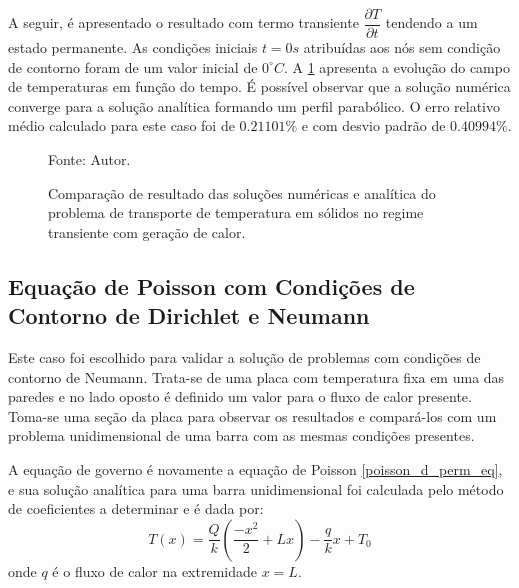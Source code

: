 A seguir, é apresentado o resultado com termo transiente $\dfrac{\partial T}{\partial t}$ tendendo a um estado permanente.
As condições iniciais $t=0s$ atribuídas aos nós sem condição de contorno foram de um valor inicial de $0^{\circ}C$.
A \ref{poisson_d_trans_comp} apresenta a evolução do campo de temperaturas em função do tempo.
É possível observar que a solução numérica converge para a solução analítica formando um perfil parabólico.
O erro relativo médio calculado para este caso foi de $0.21101\%$ e com desvio padrão de $0.40994\%$.
\begin{figure}[H]
    \centering
     {\raggedleft \scriptsize Fonte: Autor.}
    \caption{Comparação de resultado das soluções numéricas e analítica do problema de transporte de temperatura em sólidos no regime transiente com geração de calor.}
    \label{poisson_d_trans_comp}
\end{figure}

\subsection{\textbf{Equação de Poisson com Condições de Contorno de Dirichlet e Neumann}}
\label{sec_poisson_neu}
Este caso foi escolhido para validar a solução de problemas com condições de contorno de Neumann.
Trata-se de uma placa com temperatura fixa em uma das paredes e no lado oposto é definido um valor para o fluxo de calor presente.
Toma-se uma seção da placa para observar os resultados e compará-los com um problema unidimensional de uma barra com as mesmas condições presentes.

A equação de governo é novamente a equação de Poisson \eqref{poisson_d_perm_eq}, e sua solução analítica para uma barra unidimensional foi calculada pelo método de coeficientes a determinar e é dada por:
\begin{equation}
    T(x) = \dfrac{Q}{k}\left(\dfrac{-x^2}{2} + L x\right) - \dfrac{q}{k} x + T_0
    \label{poisson_n_sol} 
\end{equation}
onde $q$ é o fluxo de calor na extremidade $x=L$.

